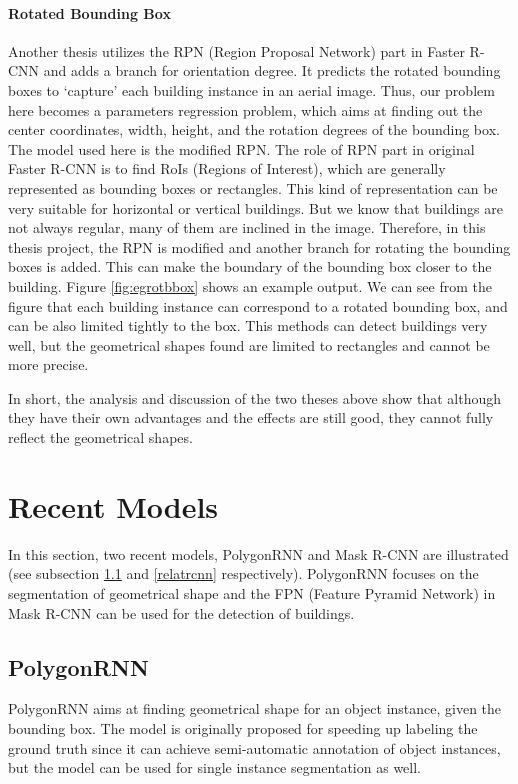 \paragraph{Rotated Bounding Box}
Another thesis utilizes the RPN (Region Proposal Network) part in Faster R-CNN and adds a branch for orientation degree. It predicts the rotated bounding boxes to `capture' each building instance in an aerial image. Thus, our problem here becomes a parameters regression problem, which aims at finding out the center coordinates, width, height, and the rotation degrees of the bounding box. The model used here is the modified RPN. The role of RPN part in original Faster R-CNN is to find RoIs (Regions of Interest), which are generally represented as bounding boxes or rectangles. This kind of representation can be very suitable for horizontal or vertical buildings. But we know that buildings are not always regular, many of them are inclined in the image. Therefore, in this thesis project, the RPN is modified and another branch for rotating the bounding boxes is added. This can make the boundary of the bounding box closer to the building. Figure \ref{fig:egrotbbox} shows an example output. We can see from the figure that each building instance can correspond to a rotated bounding box, and can be also limited tightly to the box. This methods can detect buildings very well, but the geometrical shapes found are limited to rectangles and cannot be more precise.



In short, the analysis and discussion of the two theses above show that although they have their own advantages and the effects are still good, they cannot fully reflect the geometrical shapes.

\section{Recent Models}\label{relatrec}

In this section, two recent models, PolygonRNN and Mask R-CNN are illustrated (see subsection \ref{relatpoly} and \ref{relatrcnn} respectively). PolygonRNN focuses on the segmentation of geometrical shape and the FPN (Feature Pyramid Network) in Mask R-CNN can be used for the detection of buildings.

\subsection{PolygonRNN}\label{relatpoly}
PolygonRNN aims at finding geometrical shape for an object instance, given the bounding box. The model is originally proposed for speeding up labeling the ground truth since it can achieve semi-automatic annotation of object instances, but the model can be used for single instance segmentation as well.

